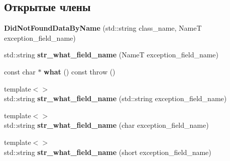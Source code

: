 \subsection*{Открытые члены}
\begin{DoxyCompactItemize}
\item 
\mbox{\label{struct_s_p_u_1_1_did_not_found_data_by_name_a36425abe5ba033c069c704383870dd81}} 
{\bfseries Did\+Not\+Found\+Data\+By\+Name} (std\+::string class\+\_\+name, NameT exception\+\_\+field\+\_\+name)
\item 
\mbox{\label{struct_s_p_u_1_1_did_not_found_data_by_name_ac40019d6c1f692d2e2b7f56b4bf180ea}} 
std\+::string {\bfseries str\+\_\+what\+\_\+field\+\_\+name} (NameT exception\+\_\+field\+\_\+name)
\item 
\mbox{\label{struct_s_p_u_1_1_did_not_found_data_by_name_ab31e718db83c43fd2d1688840224e62f}} 
const char $\ast$ {\bfseries what} () const  throw ()
\item 
\mbox{\label{struct_s_p_u_1_1_did_not_found_data_by_name_ad8cfe3da39cec8c06381b80d0553277e}} 
{\footnotesize template$<$$>$ }\\std\+::string {\bfseries str\+\_\+what\+\_\+field\+\_\+name} (std\+::string exception\+\_\+field\+\_\+name)
\item 
\mbox{\label{struct_s_p_u_1_1_did_not_found_data_by_name_a19fbababbe3159d560ca6edadc29c4ef}} 
{\footnotesize template$<$$>$ }\\std\+::string {\bfseries str\+\_\+what\+\_\+field\+\_\+name} (char exception\+\_\+field\+\_\+name)
\item 
\mbox{\label{struct_s_p_u_1_1_did_not_found_data_by_name_a5a5618e56ac6b83a5a7d35087f8126c9}} 
{\footnotesize template$<$$>$ }\\std\+::string {\bfseries str\+\_\+what\+\_\+field\+\_\+name} (short exception\+\_\+field\+\_\+name)
\item 
\mbox{\label{struct_s_p_u_1_1_did_not_found_data_by_name_a6d7edeeb95fe41e8bf812a9e0cf95de7}} 

\end{DoxyCompactItemize}
